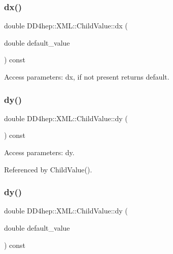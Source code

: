 \subsubsection{\texorpdfstring{dx()}{dx()}\hspace{0.1cm}{\footnotesize\ttfamily [2/2]}}
{\footnotesize\ttfamily double D\+D4hep\+::\+X\+M\+L\+::\+Child\+Value\+::dx (\begin{DoxyParamCaption}\item[{double}]{default\+\_\+value }\end{DoxyParamCaption}) const}



Access parameters\+: dx, if not present returns default. 

\hypertarget{struct_d_d4hep_1_1_x_m_l_1_1_child_value_ace7f59799d67b2706691a2f79019f7bf}{}\label{struct_d_d4hep_1_1_x_m_l_1_1_child_value_ace7f59799d67b2706691a2f79019f7bf} 
\subsubsection{\texorpdfstring{dy()}{dy()}\hspace{0.1cm}{\footnotesize\ttfamily [1/2]}}
{\footnotesize\ttfamily double D\+D4hep\+::\+X\+M\+L\+::\+Child\+Value\+::dy (\begin{DoxyParamCaption}{ }\end{DoxyParamCaption}) const}



Access parameters\+: dy. 



Referenced by Child\+Value().

\hypertarget{struct_d_d4hep_1_1_x_m_l_1_1_child_value_a532be6cbe2e5827d8b65b63dadf97fc4}{}\label{struct_d_d4hep_1_1_x_m_l_1_1_child_value_a532be6cbe2e5827d8b65b63dadf97fc4} 
\subsubsection{\texorpdfstring{dy()}{dy()}\hspace{0.1cm}{\footnotesize\ttfamily [2/2]}}
{\footnotesize\ttfamily double D\+D4hep\+::\+X\+M\+L\+::\+Child\+Value\+::dy (\begin{DoxyParamCaption}\item[{double}]{default\+\_\+value }\end{DoxyParamCaption}) const}



